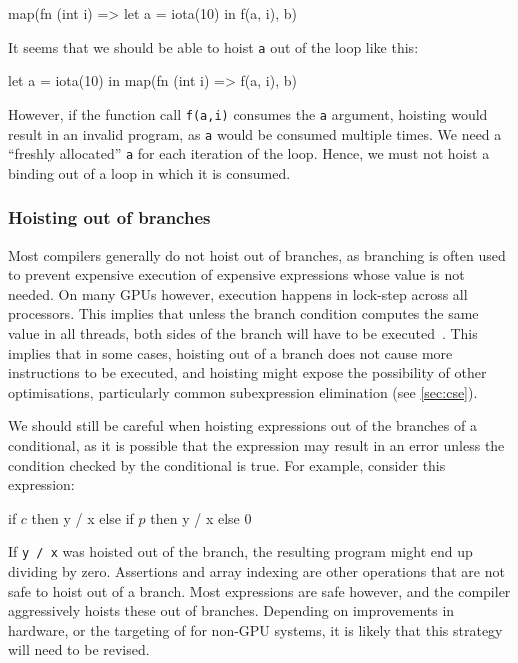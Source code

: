 \begin{colorcode}
map(fn (int i) =>
      let a = iota(10) in
      f(a, i),
    b)
\end{colorcode}

It seems that we should be able to hoist \texttt{a} out of the loop
like this:

\begin{colorcode}
let a = iota(10) in
map(fn (int i) =>
      f(a, i),
    b)
\end{colorcode}

However, if the function call \texttt{f(a,i)} consumes the \texttt{a}
argument, hoisting would result in an invalid program, as \texttt{a}
would be consumed multiple times.  We need a ``freshly allocated''
\texttt{a} for each iteration of the loop.  Hence, we must not hoist a
binding out of a loop in which it is consumed.

\subsubsection{Hoisting out of branches}

Most compilers generally do not hoist out of branches, as branching is
often used to prevent expensive execution of expensive expressions
whose value is not needed.  On many GPUs however, execution happens in
lock-step across all processors.  This implies that unless the branch
condition computes the same value in all threads, both sides of the
branch will have to be executed~\cite{reducing-branch-divergence}.
This implies that in some cases, hoisting out of a branch does not
cause more instructions to be executed, and hoisting might expose the
possibility of other optimisations, particularly common subexpression
elimination (see \cref{sec:cse}).

We should still be careful when hoisting expressions out of the
branches of a conditional, as it is possible that the expression may
result in an error unless the condition checked by the conditional is
true.  For example, consider this expression:

\begin{colorcode}
if \(c\) then y / x
     else if \(p\) then y / x
               else 0
\end{colorcode}

If \texttt{y / x} was hoisted out of the branch, the resulting program
might end up dividing by zero.  Assertions and array indexing are
other operations that are not safe to hoist out of a branch.  Most
expressions are safe however, and the \LO{} compiler aggressively
hoists these out of branches.  Depending on improvements in hardware,
or the targeting of \LO{} for non-GPU systems, it is likely that this
strategy will need to be revised.

